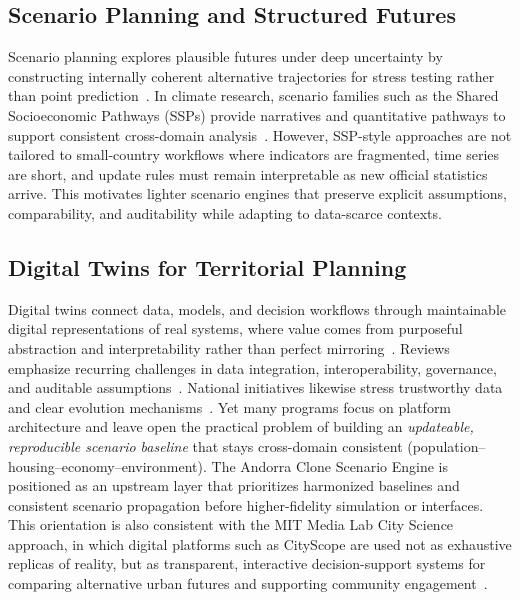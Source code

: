 \documentclass{article}
\begin{document}
\subsection{Scenario Planning and Structured Futures}
Scenario planning explores plausible futures under deep uncertainty by
constructing internally coherent alternative trajectories for stress testing
rather than point prediction~\cite{amer2013scenario}. In climate research,
scenario families such as the Shared Socioeconomic Pathways (SSPs) provide
narratives and quantitative pathways to support consistent cross-domain
analysis~\cite{riahi2017ssps,oneill2014ssp}. However, SSP-style approaches are
not tailored to small-country workflows where indicators are fragmented, time
series are short, and update rules must remain interpretable as new official
statistics arrive. This motivates lighter scenario engines that preserve
explicit assumptions, comparability, and auditability while adapting to
data-scarce contexts.

\subsection{Digital Twins for Territorial Planning}
Digital twins connect data, models, and decision workflows through maintainable
digital representations of real systems, where value comes from purposeful
abstraction and interpretability rather than perfect
mirroring~\cite{batty2018digitaltwins}. Reviews emphasize recurring challenges
in data integration, interoperability, governance, and auditable
assumptions~\cite{udtreview2024}. National initiatives likewise stress
trustworthy data and clear evolution
mechanisms~\cite{cdbb2018gemini,ndtp2024principles}. Yet many programs focus on
platform architecture and leave open the practical problem of building an
\emph{updateable, reproducible scenario baseline} that stays cross-domain
consistent (population--housing--economy--environment). The Andorra Clone
Scenario Engine is positioned as an upstream layer that prioritizes harmonized
baselines and consistent scenario propagation before higher-fidelity simulation
or interfaces. This orientation is also consistent with the MIT Media Lab City
Science approach, in which digital platforms such as CityScope are used not as
exhaustive replicas of reality, but as transparent, interactive
decision-support systems for comparing alternative urban futures and supporting
community engagement~\cite{grignard2018cityscope,berke2022using}.
\end{document}
